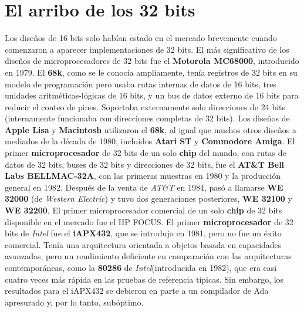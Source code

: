 \section{El arribo de los 32 bits}
Los diseños de 16 bits solo habían estado en el mercado brevemente cuando comenzaron a aparecer implementaciones de 32 bits.
El más significativo de los diseños de  microprocesadores de 32 bits fue el \textbf{Motorola MC68000}, introducido en 1979. 
El \textbf{68k}, como se le conocía ampliamente, tenía  registros de 32 bits en su modelo de programación pero usaba rutas internas
de datos de 16 bits, tres unidades aritméticas-lógicas de 16 bits, y un bus de datos externo de 16 bits para reducir 
el conteo de pines. Soportaba externamente solo direcciones de 24 bits (internamente funcionaba con direcciones completas de 
32 bits). Los diseños de \textbf{Apple Lisa} y \textbf{Macintosh} utilizaron el \textbf{68k}, al igual que muchos otros diseños a
mediados de la década de 1980, incluidos \textbf{Atari ST} y \textbf{Commodore Amiga}. El primer \textbf{microprocesador} de 32 bits de
un solo \textbf{chip} del mundo, con rutas de datos de 32 bits, buses de 32 bits y direcciones de 32 bits, fue el \textbf{AT\&T Bell Labs BELLMAC-32A},
con las primeras muestras en 1980 y la producción general en 1982. Después de la venta de \emph{AT\&T} en 1984, pasó a llamarse \textbf{WE 32000}
(de \emph{Western Electric}) y tuvo dos generaciones posteriores, \textbf{WE 32100} y \textbf{WE 32200}. El primer microprocesador comercial de
un solo \textbf{chip} de 32 bits disponible en el mercado fue el HP FOCUS. El primer \textbf{microprocesador} de 32 bits de \emph{Intel} fue el \textbf
{iAPX432}, que se introdujo en 1981, pero no fue un éxito comercial. Tenía una arquitectura orientada a objetos basada en capacidades avanzadas,
pero un rendimiento deficiente en comparación con las arquitecturas contemporáneas, como la \textbf{80286} de \emph{Intel}(introducida en 1982),
que era casi cuatro veces más rápida en las pruebas de referencia típicas. Sin embargo, los resultados para el iAPX432 se debieron en parte a un
compilador de Ada apresurado y, por lo tanto, subóptimo.

